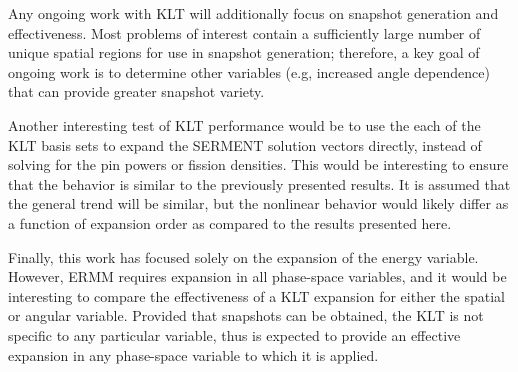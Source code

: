 Any ongoing work with KLT will additionally focus on snapshot generation and 
effectiveness.  Most problems of interest contain a 
sufficiently large number of unique spatial
regions for use in snapshot generation; therefore, a key goal of ongoing work is 
to determine other variables (e.g, increased angle dependence)
that can provide greater snapshot variety.  

Another interesting test of KLT performance would be to use the each of the KLT 
basis sets to expand the SERMENT solution vectors directly, instead of 
solving for the pin powers or fission densities.  This would be interesting to 
ensure that the behavior is similar to the previously presented results.  It is 
assumed that the general trend will be similar, but the nonlinear behavior 
would likely differ as a function of expansion order as compared to the results 
presented here.

Finally, this work has focused solely on the expansion of the energy 
variable. However, ERMM requires expansion in all phase-space 
variables, and it would be interesting to compare the effectiveness 
of a KLT expansion for either the spatial or angular variable.  
Provided that snapshots can be obtained, the KLT is not specific to 
any particular variable, thus is expected to provide an effective 
expansion in any phase-space variable to which it is applied.  
